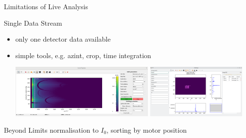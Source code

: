 \documentclass[aspectratio=169]{beamer}
\begin{document}
\begin{frame}{Limitations of Live Analysis}
 \begin{block}{Single Data Stream}
  \begin{itemize}
   \item only one detector data available
   \item simple tools, e.g. azint, crop, time integration
\medskip

   \includegraphics[height=2.7cm]{dets/azint}  \includegraphics[height=2.7cm]{img/femtomax}
  \end{itemize}
 \end{block}
 \begin{block}{Beyond Limits}
  normalisation to $I_0$, sorting by motor position
 \end{block}
\end{frame}
\end{document}
